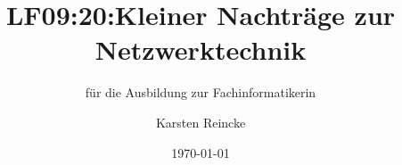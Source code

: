 \documentclass[]{beamer}
\title{LF09:20:Kleiner Nachträge zur Netzwerktechnik}
\subtitle{für die Ausbildung zur Fachinformatikerin}
\institute[GS-LDK]{Gewerbliche Schulen Dillenburg}
\author{Karsten Reincke}
\date{\today}
\def\cfgGl{../../../cfg.gl/}
\begin{document}

\begin{frame}
  \titlepage

  
\end{frame}






\logo{}
\newpage



%
\end{document}
